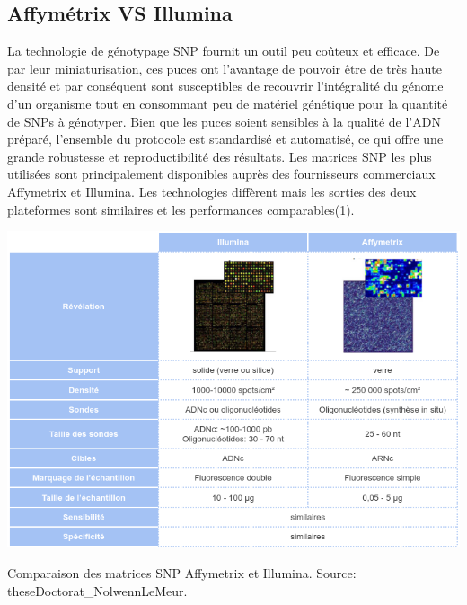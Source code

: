\documentclass{style}
\begin{document}
\subsection{Affymétrix VS Illumina}
La technologie de génotypage SNP fournit un outil peu coûteux et efficace. De par leur miniaturisation, ces puces ont l’avantage de pouvoir être de très haute densité et par conséquent sont susceptibles de recouvrir l’intégralité du génome d’un organisme tout en consommant peu de matériel génétique pour la quantité de SNPs à génotyper. Bien que les puces soient sensibles à la qualité de l’ADN préparé, l'ensemble du protocole est standardisé et automatisé, ce qui offre une grande robustesse et reproductibilité des résultats. 
Les matrices SNP les plus utilisées sont principalement disponibles auprès des fournisseurs commerciaux Affymetrix et Illumina. Les technologies diffèrent mais les sorties des deux plateformes sont similaires et les performances comparables(1).
\begin{table}[H]
    \centering
    \includegraphics[width=15cm]{images/figures/tableArray.png}
    \caption[Comparaison des matrices SNP Affymetrix et Illumina.]{Comparaison des matrices SNP Affymetrix et Illumina. Source: theseDoctorat\_NolwennLeMeur.}
    \label{tab:comparison}
\end{table}
 
\end{document}
